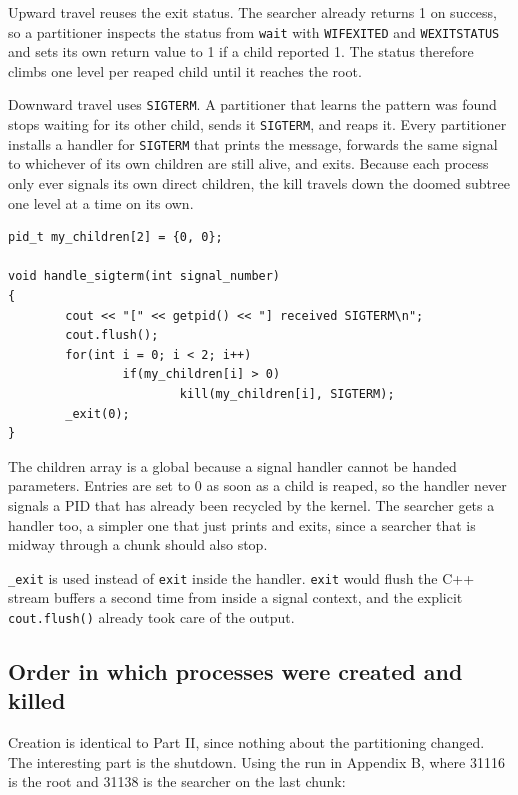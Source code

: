 \documentclass[11pt]{article}
\begin{document}
Upward travel reuses the exit status. The searcher already returns 1 on success, so
a partitioner inspects the status from \texttt{wait} with \texttt{WIFEXITED} and
\texttt{WEXITSTATUS} and sets its own return value to 1 if a child reported 1. The
status therefore climbs one level per reaped child until it reaches the root.

Downward travel uses \texttt{SIGTERM}. A partitioner that learns the pattern was
found stops waiting for its other child, sends it \texttt{SIGTERM}, and reaps it.
Every partitioner installs a handler for \texttt{SIGTERM} that prints the message,
forwards the same signal to whichever of its own children are still alive, and
exits. Because each process only ever signals its own direct children, the kill
travels down the doomed subtree one level at a time on its own.

\begin{lstlisting}
pid_t my_children[2] = {0, 0};

void handle_sigterm(int signal_number)
{
        cout << "[" << getpid() << "] received SIGTERM\n";
        cout.flush();
        for(int i = 0; i < 2; i++)
                if(my_children[i] > 0)
                        kill(my_children[i], SIGTERM);
        _exit(0);
}
\end{lstlisting}

The children array is a global because a signal handler cannot be handed
parameters. Entries are set to 0 as soon as a child is reaped, so the handler never
signals a PID that has already been recycled by the kernel. The searcher gets a
handler too, a simpler one that just prints and exits, since a searcher that is
midway through a chunk should also stop.

\texttt{\_exit} is used instead of \texttt{exit} inside the handler. \texttt{exit}
would flush the C++ stream buffers a second time from inside a signal context, and
the explicit \texttt{cout.flush()} already took care of the output.

\subsection*{Order in which processes were created and killed}
Creation is identical to Part II, since nothing about the partitioning changed. The
interesting part is the shutdown. Using the run in Appendix B, where 31116 is the
root and 31138 is the searcher on the last chunk:
\end{document}
